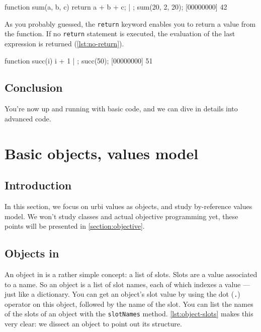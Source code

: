 \documentclass[openright,twoside,12pt]{report}
\begin{document}
\begin{urbiscript}[caption=Function with
arguments,label=lst:function-arg]

function sum(a, b, c)
{
  return a + b + c;
} | {};
sum(20, 2, 20);
[00000000] 42
\end{urbiscript}

As you probably guessed, the \texttt{return} keyword enables you to
return a value from the function. If no \texttt{return} statement is
executed, the evaluation of the last expression is returned
(\autoref{lst:no-return}).

\begin{urbiscript}[caption=Return value is the last evaluated value,
  label=lst:no-return]
function succ(i) { i + 1 } | {};
succ(50);
[00000000] 51
\end{urbiscript}

\section{Conclusion}

You're now up and running with basic \urbi code, and we can dive in
details into advanced \urbi code.

\chapter{Basic objects, \urbi values model} %

\section{Introduction}

In this section, we focus on urbi values as objects, and study \urbi
by-reference values model. We won't study classes and actual objective
programming yet, these points will be presented in
\autoref{section:objective}.

\section{Objects in \urbi}

An object in \urbi is a rather simple concept: a list of slots. Slots
are a value associated to a name. So an object is a list of slot
names, each of which indexes a value --- just like a dictionary. You
can get an object's slot value by using the dot (\texttt{.}) operator
on this object, followed by the name of the slot. You can list the
names of the slots of an object with the \texttt{slotNames}
method. \autoref{lst:object-slots} makes this very clear: we dissect an object
to point out its structure.
\end{document}
